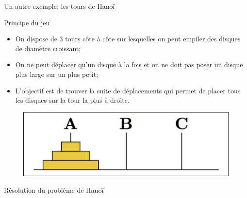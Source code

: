 \documentclass[10pt,xcolor=dvipsnames]{beamer}
\begin{document}
\begin{frame}{Un autre exemple: les tours de Hanoï}
    \begin{alertblock}{Principe du jeu}
    \begin{itemize}
        \item On dispose de 3 tours côte à côte sur lesquelles on peut empiler des disques de diamètre croissant;
        \item On ne peut déplacer qu'un disque à la fois et on ne doit pas poser un disque plus large sur un plus petit;
        \item L'objectif est de trouver la suite de déplacements qui permet de placer tous les disques sur la tour la plus à droite.
    \end{itemize}
    \end{alertblock}
    
    \begin{figure}
        \centering
        \includegraphics[scale=0.4]{figures/CM1/Hanoi-initial.png}
        \label{fig:my_label}
    \end{figure}
\end{frame}

\begin{frame}{Résolution du problème de Hanoï}
\end{frame}
\end{document}
